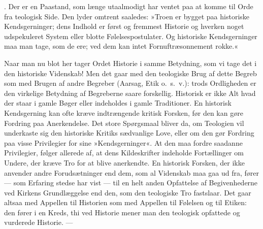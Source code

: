 \documentclass[12pt,a4paper]{article}
\newcommand{\apage}[1]{\marginnote{\footnotesize\textit{[#1]}}}
\begin{document}
\medskip
{}. Der er en Paastand, som længe utaalmodigt har ventet paa at komme til
Orde fra teologisk Side. Den lyder omtrent saaledes: »Troen er bygget paa historiske
Kendsgerninger; dens Indhold er først og fremmest Historie og hverken noget udspekuleret
System eller blotte Følelsespostulater. Og historiske Kendsgerninger maa man tage, som
de ere; ved dem kan intet Fornuftræsonnement rokke.«

Naar man nu blot her tager Ordet Historie i samme Betydning, som vi tage det i den
historiske Videnskab! Men det gaar med den teologiske Brug af dette Begreb som med
Brugen af andre Begreber (Aarsag, Etik o.\ s.\ v.): trods Ordligheden er den virkelige
Betydning af Begreberne saare forskellig. Historisk er ikke Alt hvad der staar i gamle
Bøger eller indeholdes i gamle Traditioner. En historisk Kendsgerning kan ofte kræve
indtrængende kritisk Forsken, før den kan gøre Fordring paa Anerkendelse. Det store
Spørgsmaal bliver da, om Teologien vil underkaste sig den historiske Kritiks sædvanlige
Love, eller om den gør Fordring paa visse Privilegier for sine »Kendsgerninger«. At den
maa fordre saadanne Privilegier, følger allerede af, at dens Kildeskrifter indeholde
Fortællinger om Undere, der kræve Tro for at blive anerkendte. En historisk Forsken,
der \apage{215} ikke anvender andre Forudsætninger end dem, som al Videnskab maa gaa ud fra, fører
--- som Erfaring stedse har vist --- til en helt anden Opfattelse af Begivenhederne ved
Kirkens Grundlæggelse end den, som den teologiske Tro fastslaar. Det gaar altsaa med
Appellen til Historien som med Appellen til Følelsen og til Etiken: den fører i en
Kreds, thi ved Historie mener man den teologisk opfattede og vurderede Historie. ---
\end{document}
